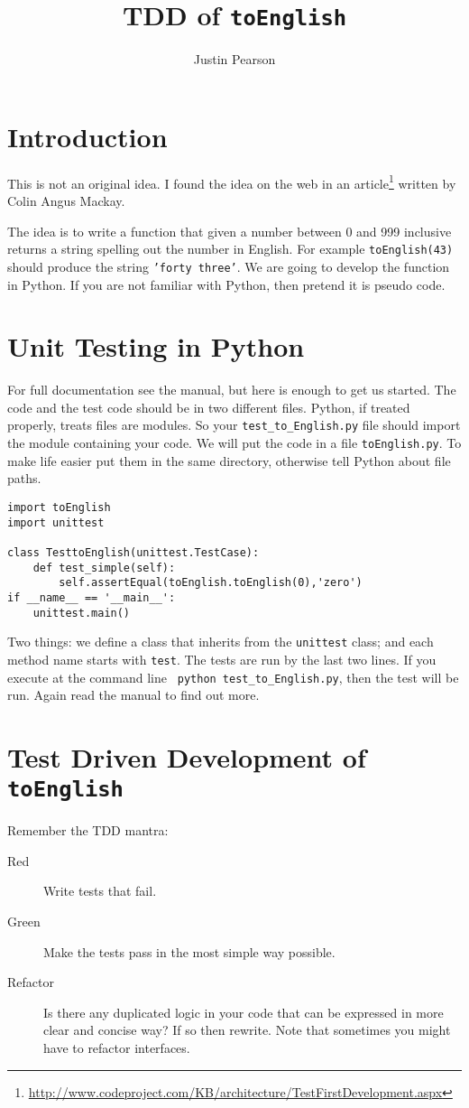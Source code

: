 \documentclass{paper}
\title{TDD of  {\tt toEnglish}}
\author{Justin Pearson}
\begin{document}
\maketitle
\section{Introduction}
This is not an original idea. I found the idea on the web in an
article\footnote{\url{http://www.codeproject.com/KB/architecture/TestFirstDevelopment.aspx}}
written by Colin Angus Mackay.

The idea is to write a function that given a number between 0 and 999
inclusive returns a string spelling out the number in English. For
example {\tt toEnglish(43)} should produce the string {\tt 'forty
  three'}. We are going to develop the function in Python. If you are
not familiar with Python, then  pretend it is pseudo code.

\section{Unit Testing in Python}
For full documentation see the manual, but here is enough to get us
started. The code and the test code should be in two different
files. Python, if treated properly, treats files are modules. So your
{\tt test\_to\_English.py} file should import the module containing
your code. We will put the code in a file {\tt toEnglish.py}. To make
life easier put them in the same directory, otherwise tell Python
about file paths.
\begin{lstlisting}
import toEnglish
import unittest

class TesttoEnglish(unittest.TestCase):
    def test_simple(self):
        self.assertEqual(toEnglish.toEnglish(0),'zero')
if __name__ == '__main__':
    unittest.main()
\end{lstlisting}
Two things: we define a class that inherits from the {\tt unittest}
class; and each method name starts with {\tt test}.   The tests are
run by the last two lines. If you execute at the command line {\tt
  python   test\_to\_English.py}, then the test will be run. Again read
the manual to find out more.

\section{Test Driven Development of {\tt toEnglish}}
Remember the TDD mantra:
\begin{description}
\item[Red] Write tests that fail.
\item[Green] Make the tests pass in the most simple way possible.
\item[Refactor]  Is there any duplicated logic in your code that can
  be expressed in more clear and concise way? If so then rewrite. Note
  that sometimes you might have to refactor interfaces. 
\end{description}
\end{document}
